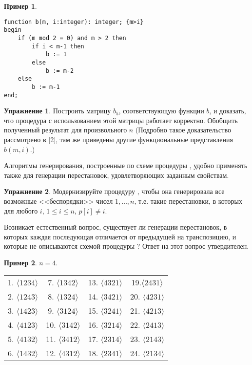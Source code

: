 \documentclass[12pt,a4paper]{article}
\theoremstyle{plain}
\theoremstyle{definition}
\newtheorem*{task}{Упражнение}
\newtheorem*{example}{Пример}
\theoremstyle{remark}
\begin{document}
\begin{example}
\begin{verbatim}
function b(m, i:integer): integer; {m>i}
begin
    if (m mod 2 = 0) and m > 2 then
        if i < m-1 then
            b := 1
        else
            b := m-2
    else
        b := m-1
end;
\end{verbatim}
\end{example}

\begin{task}
Построить матрицу $b_5$, соответствующую функции $b$, и доказать, что процедура \verb@PERM@ с использованием этой матрицы работает корректно.
Обобщить полученный результат для произвольного $n$ (Подробно такое доказательство рассмотрено в [2], там же приведены другие функциональные представления $b(m,i)$.)
\end{task}

Алгоритмы генерирования, построенные по схеме процедуры \verb@perm@, удобно применять также для генерации перестановок, удовлетворяющих заданным свойствам.

\begin{task}
Модернизируйте процедуру \verb@perm@, чтобы она генерировала все возможные <<беспорядки>> чисел $1,\ldots,n$, т.е. такие перестановки, в которых для любого $i$, $1\le i\le n$, $p[i]\ne i$.
\end{task}

Возникает естественный вопрос, существует ли генерации перестановок, в которых каждая последующая отличается от предыдущей на транспозицию, и которые не описываются схемой процедуры \verb@perm@? Ответ на этот вопрос утвердителен.

\begin{example}
$n=4$.

\begin{tabular}{cccc}
1. $\langle1 2 3 4\rangle$ & 7. $\langle1 3 4 2\rangle$ & 13. $\langle4 3 2 1\rangle$ & 19.$\langle 2 4 3 1\rangle$ \\
2. $\langle1 2 4 3\rangle$ & 8. $\langle1 3 2 4\rangle$ & 14. $\langle3 4 2 1\rangle$ & 20. $\langle4 2 3 1\rangle$ \\
3. $\langle1 4 2 3\rangle$ & 9. $\langle3 1 2 4\rangle$ & 15. $\langle3 2 4 1\rangle$ & 21. $\langle4 2 1 3\rangle$ \\
4. $\langle4 1 2 3\rangle$ & 10. $\langle3 1 4 2\rangle$ & 16. $\langle3 2 1 4\rangle$ & 22. $\langle2 4 1 3\rangle$ \\
5. $\langle4 1 3 2\rangle$ & 11. $\langle3 4 1 2\rangle$ & 17. $\langle2 3 1 4\rangle$ & 23. $\langle2 1 4 3\rangle$ \\
6. $\langle1 4 3 2\rangle$ & 12. $\langle4 3 1 2\rangle$ & 18. $\langle2 3 4 1\rangle$ & 24. $\langle2 1 3 4\rangle$ \\
\end{tabular}
\end{example}
\end{document}
